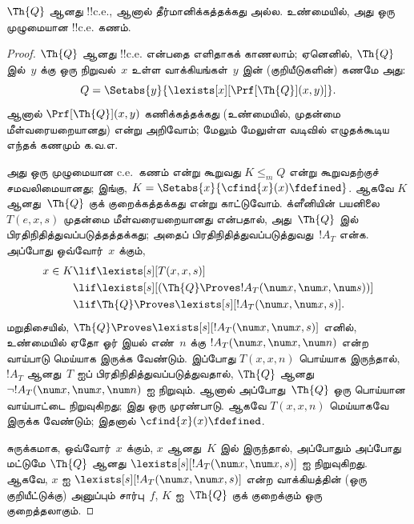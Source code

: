 \documentclass[../../../include/open-logic-section]{subfiles}
\begin{document}



\begin{thm}
$\Th{Q}$ ஆனது !!{c.e.}, ஆனால் தீர்மானிக்கத்தக்கது அல்ல. உண்மையில்,
அது ஒரு முழுமையான !!{c.e.} கணம்.
\end{thm}

\begin{proof}
$\Th{Q}$ ஆனது !!{c.e.} என்பதை எளிதாகக் காணலாம்; ஏனெனில்,
$\Th{Q}$ இல்~$y$ க்கு ஒரு நிறுவல்~$x$ உள்ள வாக்கியங்கள்~$y$ இன்
(குறியீடுகளின்) கணமே அது:
\[
Q = \Setabs{y}{\lexists[x][\Prf[\Th{Q}](x,y)]}.
\]
ஆனால் $\Prf[\Th{Q}](x,y)$ கணிக்கத்தக்கது (உண்மையில், முதன்மை
மீள்வரையறையானது) என்று அறிவோம்; மேலும் மேலுள்ள வடிவில் எழுதக்கூடிய எந்தக்
கணமும் க.வ.எ.

அது ஒரு முழுமையான c.e.\ கணம் என்று கூறுவது $K \leq_m Q$ என்று கூறுவதற்குச்
சமவலிமையானது; இங்கு,
$K = \Setabs{x}{\cfind{x}(x) \fdefined}$. ஆகவே $K$ ஆனது~$\Th{Q}$ குக்
குறைக்கத்தக்கது என்று காட்டுவோம். க்ளீனியின் பயனிலை~$T(e,x,s)$ முதன்மை
மீள்வரையறையானது என்பதால், அது~$\Th{Q}$ இல் பிரதிநிதித்துவப்படுத்தத்தக்கது;
அதைப் பிரதிநிதித்துவப்படுத்துவது~$!A_T$ என்க. அப்போது ஒவ்வோர்~$x$ க்கும்,
\begin{align*}
x \in K & \lif \lexists[s][T(x,x,s)] \\
& \lif \lexists[s][(\Th{Q} \Proves !A_T(\num x,\num x, \num s))]
  \\
& \lif \Th{Q} \Proves \lexists[s][!A_T(\num x, \num x, s)].
\end{align*}
மறுதிசையில்,
$\Th{Q} \Proves \lexists[s][!A_T(\num x, \num x, s)]$ எனில், உண்மையில்
ஏதோ ஓர் இயல் எண்~$n$ க்கு $!A_T(\num x,\num x,\num n)$ என்ற வாய்பாடு
மெய்யாக இருக்க வேண்டும். இப்போது $T(x,x,n)$ பொய்யாக இருந்தால்,
$!A_T$ ஆனது~$T$ ஐப் பிரதிநிதித்துவப்படுத்துவதால், $\Th{Q}$ ஆனது
$\lnot !A_T(\num x,\num x,\num n)$ ஐ நிறுவும். ஆனால் அப்போது~$\Th{Q}$
ஒரு பொய்யான வாய்பாட்டை நிறுவுகிறது; இது ஒரு முரண்பாடு. ஆகவே
$T(x,x,n)$ மெய்யாகவே இருக்க வேண்டும்; இதனால்
$\cfind{x}(x) \fdefined$.

சுருக்கமாக, ஒவ்வோர்~$x$ க்கும், $x$ ஆனது~$K$ இல் இருந்தால், அப்போதும் அப்போது மட்டுமே
$\Th{Q}$ ஆனது $\lexists[s][!A_T(\num x,\num x,s)]$ ஐ நிறுவுகிறது.
ஆகவே, $x$ ஐ
$\lexists[s][!A_T(\num x,\num x,s)]$ என்ற வாக்கியத்தின் (ஒரு
குறியீட்டுக்கு) அனுப்பும் சார்பு~$f$, $K$ ஐ~$\Th{Q}$ குக் குறைக்கும்
ஒரு குறைத்தலாகும்.
\end{proof}
\end{document}
